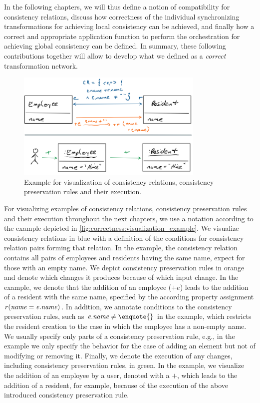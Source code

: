 In the following chapters, we will thus define a notion of compatibility for consistency relations, discuss how correctness of the individual synchronizing transformations for achieving local consistency can be achieved, and finally how a correct and appropriate application function to perform the orchestration for achieving global consistency can be defined.
In summary, these following contributions together will allow to develop what we defined as a \emph{correct} transformation network.

\begin{figure}
    \centering
    \includegraphics[width=0.8\textwidth]{figures/correctness/notion/visualization_example.png}
    \caption[Example for concept visualizations]{Example for visualization of consistency relations, consistency preservation rules and their execution.}
    \label{fig:correctness:visualization_example}
\end{figure}

For visualizing examples of consistency relations, consistency preservation rules and their execution throughout the next chapters, we use a notation according to the example depicted in \autoref{fig:correctness:visualization_example}.
We visualize consistency relations in blue with a definition of the conditions for consistency relation pairs forming that relation.
In the example, the consistency relation contains all pairs of employees and residents having the same name, expect for those with an empty name.
We depict consistency preservation rules in orange and denote which changes it produces because of which input change.
In the example, we denote that the addition of an employee ($+e$) leads to the addition of a resident with the same name, specified by the according property assignment $r(\mathit{name} = \mathit{e.name})$.
In addition, we annotate conditions to the consistency preservation rules, such as $\mathvariable{e.name} \neq \textnormal{\enquote{}}$ in the example, which restricts the resident creation to the case in which the employee has a non-empty name.
We usually specify only parts of a consistency preservation rule, e.g., in the example we only specify the behavior for the case of adding an element but not of modifying or removing it.
Finally, we denote the execution of any changes, including consistency preservation rules, in green.
In the example, we visualize the addition of an employee by a user, denoted with a $+$, which leads to the addition of a resident, for example, because of the execution of the above introduced consistency preservation rule.


